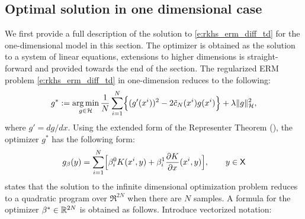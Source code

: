 \subsection{Optimal solution in one dimensional case}
\label{sec:one_dimension}
We first provide a full description of the solution to \eqref{e:rkhs_erm_diff_td} for the one-dimensional model in this section. The optimizer is obtained as the solution to a system of linear equations, extensions to higher dimensions is straight-forward and provided towards the end of the section. 
The regularized ERM problem \eqref{e:rkhs_erm_diff_td} in one-dimension reduces to the following:
\begin{equation}
g^* := \argmin_{g\in\clH} \frac{1}{N} \sum_{i=1}^N \Bigl\{ (g'(x^i))^2 - 2 \tilc_N(x^i) g(x^i) \Bigr\} + \lambda \|g\|^2_\clH,
\label{e:rkhs_1dloss}
\end{equation}
where $g' = d g / d x$. Using the extended form of the Representer Theorem (), the optimizer $g^*$ has the following form:
\begin{equation}
g_\rkhsparam(y)= \sum_{i=1}^N \Bigl[\rkhsparam_i^{0} K(x^i,y) + \rkhsparam_i^{1} \frac{\partial K}{\partial x}(x^i,y)\Bigr], \qquad y \in \state
\label{e:rkhs_g_star}
\end{equation}
  states that the solution to  the infinite dimensional optimization problem reduces to a quadratic program over $\Re^{2N}$ when there are $N$ samples. A formula for the optimizer  $\beta^* \in \mathbb{R}^{2N}$ is obtained as follows.
Introduce vectorized notation:
